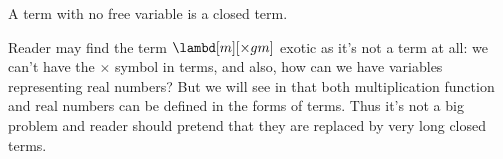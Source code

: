 \documentclass[../../../include/open-logic-section]{subfiles}
\begin{document}
\begin{defn}
  A term with no free variable is a closed term.
\end{defn}

\begin{editorial}
  Reader may find the term $\lambd[m][\times g m]$ exotic as it's not
  a term at all: we can't have the $\times$ symbol in terms, and also,
  how can we have variables representing real numbers? But we will see
  in \olref[lc][rep] that both multiplication function and real
  numbers can be defined in the forms of terms. Thus it's not a big
  problem and reader should pretend that they are replaced by very
  long closed terms.
\end{editorial}
\end{document}
